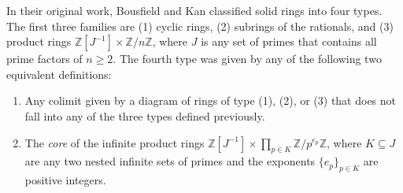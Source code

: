 \documentclass{amsart}
\newcommand\TODO[1]{\textcolor{red}{Pendiente: #1}}
\newcommand{\Z}{{\mathbb Z}}
\begin{document}
        
    

    In their original work, Bousfield and Kan classified solid rings into four types.
    The first three families are (1) cyclic rings, (2) subrings of the rationals, and (3) product rings $\Z[J^{-1}] \times \Z/n\Z$, where $J$ is any set of primes that contains all prime factors of $n \geq 2$.
    The fourth type was given by any of the following two equivalent definitions:
    
    \begin{enumerate}
        \item[(4a)] Any colimit given by a diagram of rings of type (1), (2), or (3) that does not fall into any of the three types defined previously.

        \item[(4b)] The \emph{core} of the infinite product rings $\Z[J^{-1}] \times \prod\limits_{p \in K} \Z/p^{e_p}\Z$, where $K \subseteq J$ are any two nested infinite sets of primes and the exponents $\{e_p\}_{p \in K}$ are positive integers.
    \end{enumerate}
\end{document}
